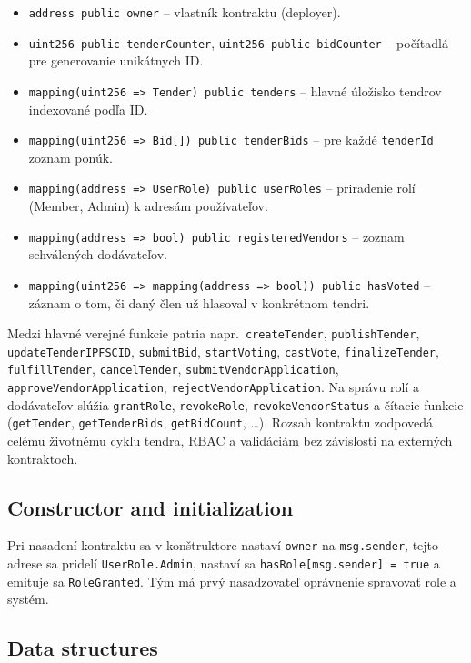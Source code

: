 \begin{itemize}
    \item \texttt{address public owner} – vlastník kontraktu (deployer).
    \item \texttt{uint256 public tenderCounter}, \texttt{uint256 public bidCounter} – počítadlá pre generovanie unikátnych ID.
    \item \texttt{mapping(uint256 => Tender) public tenders} – hlavné úložisko tendrov indexované podľa ID.
    \item \texttt{mapping(uint256 => Bid[]) public tenderBids} – pre každé \texttt{tenderId} zoznam ponúk.
    \item \texttt{mapping(address => UserRole) public userRoles} – priradenie rolí (Member, Admin) k adresám používateľov.
    \item \texttt{mapping(address => bool) public registeredVendors} – zoznam schválených dodávateľov.
    \item \texttt{mapping(uint256 => mapping(address => bool)) public hasVoted} – záznam o tom, či daný člen už hlasoval v konkrétnom tendri.
\end{itemize}

Medzi hlavné verejné funkcie patria napr.\ \texttt{createTender},
\texttt{publishTender}, \texttt{updateTenderIPFSCID}, \texttt{submitBid},
\texttt{startVoting}, \texttt{castVote}, \texttt{finalizeTender},
\texttt{fulfillTender}, \texttt{cancelTender}, \texttt{submitVendorApplication},
\texttt{approveVendorApplication}, \texttt{rejectVendorApplication}. Na správu
rolí a dodávateľov slúžia \texttt{grantRole}, \texttt{revokeRole},
\texttt{revokeVendorStatus} a čítacie funkcie (\texttt{getTender},
\texttt{getTenderBids}, \texttt{getBidCount}, \dots). Rozsah kontraktu zodpovedá
celému životnému cyklu tendra, RBAC a validáciám bez závislosti na externých
kontraktoch.

\subsection{Constructor and initialization}

Pri nasadení kontraktu sa v konštruktore nastaví \texttt{owner} na \texttt{msg.sender}, tejto adrese sa pridelí \texttt{UserRole.Admin}, nastaví sa \texttt{hasRole[msg.sender] = true} a emituje sa \texttt{RoleGranted}. Tým má prvý nasadzovateľ oprávnenie spravovať role a systém.

\subsection{Data structures}

